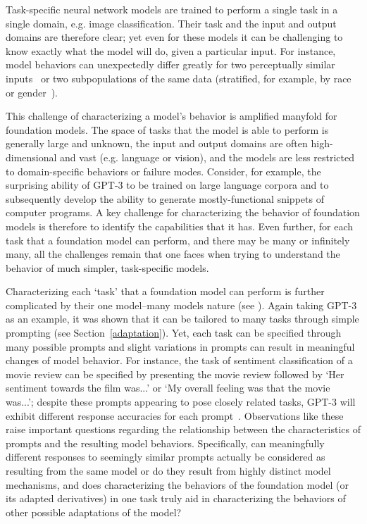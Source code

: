 Task-specific neural network models are trained to perform a single task in a single domain, e.g. image classification. Their task and the input and output domains are therefore clear; yet even for these models it can be challenging to know exactly what the model will do, given a particular input. For instance, model behaviors can unexpectedly differ greatly for two perceptually similar inputs~\citep{garg2020bae,jin2020bert} or two subpopulations of the same data (stratified, for example, by race or gender~\citep{hovy2015,blodgett2016,tatman2017,buolamwini2018gender}).

This challenge of characterizing a model's behavior is amplified manyfold for foundation models. The space of tasks that the model is able to perform is generally large and unknown, the input and output domains are often high-dimensional and vast (e.g. language or vision), and the models are less restricted to domain-specific behaviors or failure modes. Consider, for example, the surprising ability of GPT-3 to be trained on large language corpora and to subsequently develop the ability to generate mostly-functional snippets of computer programs. A key challenge for characterizing the behavior of foundation models is therefore to identify the capabilities that it has. Even further, for each task that a foundation model can perform, and there may be many or infinitely many, all the challenges remain that one faces when trying to understand the behavior of much simpler, task-specific models.

Characterizing each `task' that a foundation model can perform is further complicated by their one model--many models nature (see ).
Again taking GPT-3 as an example, it was shown that it can be tailored to many tasks through simple prompting (see Section~\ref{adaptation}).
Yet, each task can be specified through many possible prompts and slight variations in prompts can result in meaningful changes of model behavior. For instance, the task of sentiment classification of a movie review can be specified by presenting the movie review followed by `Her sentiment towards the film was...' or `My overall feeling was that the movie was...'; despite these prompts appearing to pose closely related tasks, GPT-3 will exhibit different response accuracies for each prompt~\citep{Zhao2021calibrate}. Observations like these raise important questions regarding the relationship between the characteristics of prompts and the resulting model behaviors. Specifically, can meaningfully different responses to seemingly similar prompts actually be considered as resulting from the same model or do they result from highly distinct model mechanisms, and does characterizing the behaviors of the foundation model (or its adapted derivatives) in one task truly aid in characterizing the behaviors of other possible adaptations of the model?

